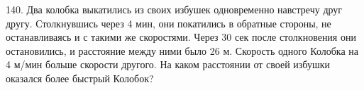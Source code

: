 140. Два колобка выкатились из своих избушек одновременно навстречу друг другу. Столкнувшись через 4 мин, они покатились в обратные стороны, не останавливаясь и с такими же скоростями. Через 30 сек после столкновения они остановились, и расстояние между ними было 26 м. Скорость одного Колобка на 4 м/мин больше скорости другого. На каком расстоянии от своей избушки оказался более быстрый Колобок?\\
